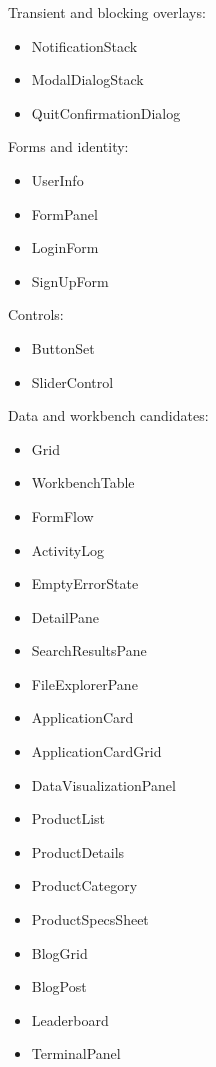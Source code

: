 Transient and blocking overlays:

\begin{itemize}
\tightlist
\item
  NotificationStack
\item
  ModalDialogStack
\item
  QuitConfirmationDialog
\end{itemize}

Forms and identity:

\begin{itemize}
\tightlist
\item
  UserInfo
\item
  FormPanel
\item
  LoginForm
\item
  SignUpForm
\end{itemize}

Controls:

\begin{itemize}
\tightlist
\item
  ButtonSet
\item
  SliderControl
\end{itemize}

Data and workbench candidates:

\begin{itemize}
\tightlist
\item
  Grid
\item
  WorkbenchTable
\item
  FormFlow
\item
  ActivityLog
\item
  EmptyErrorState
\item
  DetailPane
\item
  SearchResultsPane
\item
  FileExplorerPane
\item
  ApplicationCard
\item
  ApplicationCardGrid
\item
  DataVisualizationPanel
\item
  ProductList
\item
  ProductDetails
\item
  ProductCategory
\item
  ProductSpecsSheet
\item
  BlogGrid
\item
  BlogPost
\item
  Leaderboard
\item
  TerminalPanel
\end{itemize}


